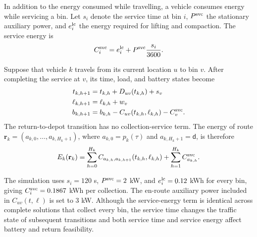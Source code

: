 
In addition to the energy consumed while travelling, a vehicle consumes energy while servicing a bin. Let $s_i$ denote the service time at bin $i$, $P^{\rm svc}$ the stationary auxiliary power, and $e_i^{\rm lc}$ the energy required for lifting and compaction. The service energy is
\begin{align}
C_i^{\rm svc}=e_i^{\rm lc}+P^{\rm svc}\frac{s_i}{3600}.
\label{eq:service-energy}
\end{align}

Suppose that vehicle $k$ travels from its current location $u$ to bin $v$. After completing the service at $v$, its time, load, and battery states become
\begin{align}
t_{k,h+1}&=t_{k,h}+D_{uv}(t_{k,h})+s_v\\
\ell_{k,h+1}&=\ell_{k,h}+w_v\\
b_{k,h+1}&=b_{k,h}-C_{uv}(t_{k,h},\ell_{k,h})-C_v^{\rm svc}.
\label{eq:service-state-update}
\end{align}
The return-to-depot transition has no collection-service term. The energy of route $\mathbf r_k=(a_{k,0},\ldots,a_{k,H_k+1})$, where $a_{k,0}=p_k(\tau)$ and $a_{k,H_k+1}=\mathsf d$, is therefore
\begin{align}
E_k(\mathbf r_k)=\sum_{h=0}^{H_k}C_{a_{k,h},a_{k,h+1}}(t_{k,h},\ell_{k,h})+\sum_{h=1}^{H_k}C_{a_{k,h}}^{\rm svc}.
\label{eq:route-energy-with-service}
\end{align}

The simulation uses $s_i=120$ s, $P^{\rm svc}=2$ kW, and $e_i^{\rm lc}=0.12$ kWh for every bin, giving $C_i^{\rm svc}=0.1867$ kWh per collection. The en-route auxiliary power included in $C_{uv}(t,\ell)$ is set to 3 kW. Although the service-energy term is identical across complete solutions that collect every bin, the service time changes the traffic state of subsequent transitions and both service time and service energy affect battery and return feasibility.

